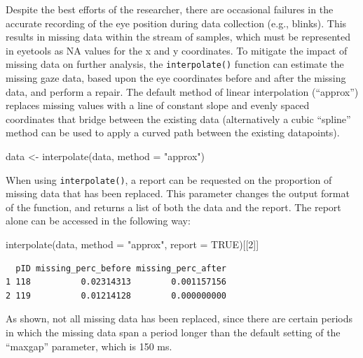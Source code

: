 \documentclass[
  man,
  floatsintext,
  longtable,
  nolmodern,
  notxfonts,
  notimes,
  colorlinks=true,linkcolor=blue,citecolor=blue,urlcolor=blue]{apa7}
\newenvironment{Shaded}{\begin{snugshade}}{\end{snugshade}}
\newcommand{\AttributeTok}[1]{\textcolor[rgb]{0.40,0.45,0.13}{#1}}
\newcommand{\ConstantTok}[1]{\textcolor[rgb]{0.56,0.35,0.01}{#1}}
\newcommand{\DecValTok}[1]{\textcolor[rgb]{0.68,0.00,0.00}{#1}}
\newcommand{\FunctionTok}[1]{\textcolor[rgb]{0.28,0.35,0.67}{#1}}
\newcommand{\NormalTok}[1]{\textcolor[rgb]{0.00,0.23,0.31}{#1}}
\newcommand{\OtherTok}[1]{\textcolor[rgb]{0.00,0.23,0.31}{#1}}
\newcommand{\StringTok}[1]{\textcolor[rgb]{0.13,0.47,0.30}{#1}}
\begin{document}
Despite the best efforts of the researcher, there are occasional
failures in the accurate recording of the eye position during data
collection (e.g., blinks). This results in missing data within the
stream of samples, which must be represented in eyetools as NA values
for the x and y coordinates. To mitigate the impact of missing data on
further analysis, the \texttt{interpolate()} function can estimate the
missing gaze data, based upon the eye coordinates before and after the
missing data, and perform a repair. The default method of linear
interpolation (``approx'') replaces missing values with a line of
constant slope and evenly spaced coordinates that bridge between the
existing data (alternatively a cubic ``spline'' method can be used to
apply a curved path between the existing datapoints).

\begin{Shaded}
\begin{Highlighting}[]
\NormalTok{data }\OtherTok{\textless{}{-}} \FunctionTok{interpolate}\NormalTok{(data, }
                    \AttributeTok{method =} \StringTok{"approx"}\NormalTok{)}
\end{Highlighting}
\end{Shaded}

When using \texttt{interpolate()}, a report can be requested on the
proportion of missing data that has been replaced. This parameter
changes the output format of the function, and returns a list of both
the data and the report. The report alone can be accessed in the
following way:

\begin{Shaded}
\begin{Highlighting}[]
\FunctionTok{interpolate}\NormalTok{(data, }
            \AttributeTok{method =} \StringTok{"approx"}\NormalTok{, }
            \AttributeTok{report =} \ConstantTok{TRUE}\NormalTok{)[[}\DecValTok{2}\NormalTok{]]}
\end{Highlighting}
\end{Shaded}

\begin{verbatim}
  pID missing_perc_before missing_perc_after
1 118          0.02314313        0.001157156
2 119          0.01214128        0.000000000
\end{verbatim}

As shown, not all missing data has been replaced, since there are
certain periods in which the missing data span a period longer than the
default setting of the ``maxgap'' parameter, which is 150 ms.
\end{document}
